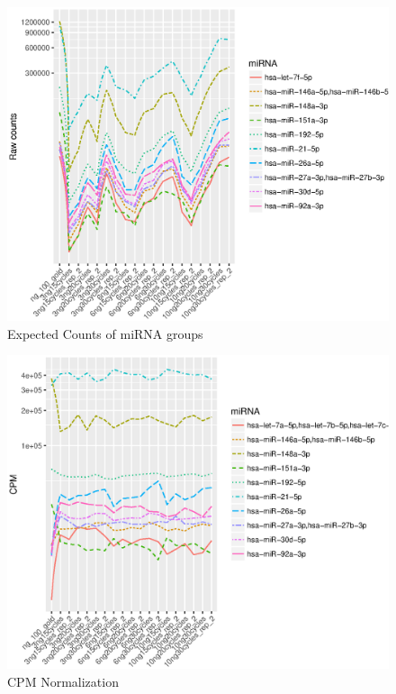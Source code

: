 \documentclass{bioinfo}
\begin{document}
\begin{figure}[!tpb]
\centerline{\includegraphics[scale=0.7]{fig-1-raw.eps}}
\caption{Expected Counts of miRNA groups}\label{fig:1}
\end{figure}

\begin{figure}[!tpb]
\centerline{\includegraphics[scale=0.7]{Fig-2-cpm.eps}}
\caption{CPM Normalization}\label{fig:2}
\end{figure} 
\end{document}
